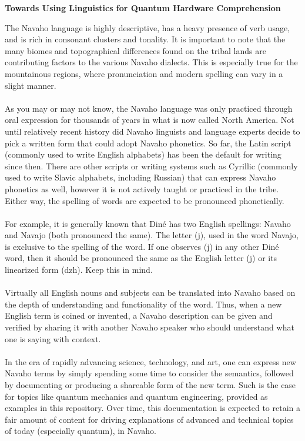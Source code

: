 \begin{center}
\Large\textbf{Towards Using Linguistics for Quantum Hardware Comprehension}
\end{center}

\large{
The Navaho language is highly descriptive, has a heavy presence of verb usage, and is rich in consonant clusters and tonality. It is important to note that the many biomes and topographical differences found on the tribal lands are contributing factors to the various Navaho dialects. This is especially true for the mountainous regions, where pronunciation and modern spelling can vary in a slight manner.
\\ 
\space
\\
\indent 
As you may or may not know, the Navaho language was only practiced through oral expression for thousands of years in what is now called North America. Not until relatively recent history did Navaho linguists and language experts decide to pick a written form that could adopt Navaho phonetics. So far, the Latin script (commonly used to write English alphabets) has been the default for writing since then. There are other scripts or writing systems such as Cyrillic (commonly used to write Slavic alphabets, including Russian) that can express Navaho phonetics as well, however it is not actively taught or practiced in the tribe. Either way, the spelling of words are expected to be pronounced phonetically.
\\ 
\space
\\
\indent 
For example, it is generally known that Diné has two English spellings: Navaho and Navajo (both pronounced the same). The letter (j), used in the word Navajo, is exclusive to the spelling of the word. If one observes (j) in any other Diné word, then it should be pronounced the same as the English letter (j) or its linearized form (dzh). Keep this in mind.
\\ 
\space
\\
\indent 
Virtually all English nouns and subjects can be translated into Navaho based on the depth of understanding and functionality of the word. Thus, when a new English term is coined or invented, a Navaho description can be given and verified by sharing it with another Navaho speaker who should understand what one is saying with context.
\\ 
\space
\\
\indent
In the era of rapidly advancing science, technology, and art, one can express new Navaho terms by simply spending some time to consider the semantics, followed by documenting or producing a shareable form of the new term. Such is the case for topics like quantum mechanics and quantum engineering, provided as examples in this repository. Over time, this documentation is expected to retain a fair amount of content for driving explanations of advanced and technical topics of today (especially quantum), in Navaho.
} 

